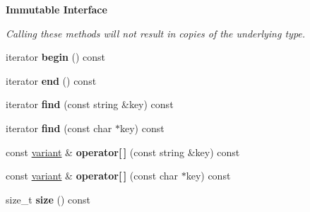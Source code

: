 \begin{Indent}\textbf{ Immutable Interface}\par
{\em Calling these methods will not result in copies of the underlying type. }\begin{DoxyCompactItemize}
\item 
\mbox{\label{classfc_1_1mutable__variant__object_a8c3f205309967abdb7fc54a6e87c2c76}} 
iterator {\bfseries begin} () const
\item 
\mbox{\label{classfc_1_1mutable__variant__object_a4d3913ee42df2e7d83a1a2f39f14b1fd}} 
iterator {\bfseries end} () const
\item 
\mbox{\label{classfc_1_1mutable__variant__object_adc3ed86b72879f95ffc2b9398a7995c8}} 
iterator {\bfseries find} (const string \&key) const
\item 
\mbox{\label{classfc_1_1mutable__variant__object_affd5b9ab3085b88e1f314da0affaabfb}} 
iterator {\bfseries find} (const char $\ast$key) const
\item 
\mbox{\label{classfc_1_1mutable__variant__object_a87ac08a28b843cc6342adb343edc85f6}} 
const \mbox{\hyperlink{classfc_1_1variant}{variant}} \& {\bfseries operator\mbox{[}$\,$\mbox{]}} (const string \&key) const
\item 
\mbox{\label{classfc_1_1mutable__variant__object_ae0d3415028e74c088642234907ece532}} 
const \mbox{\hyperlink{classfc_1_1variant}{variant}} \& {\bfseries operator\mbox{[}$\,$\mbox{]}} (const char $\ast$key) const
\item 
\mbox{\label{classfc_1_1mutable__variant__object_a0612732e6fcc4b2017dd7f15590d16bd}} 
size\+\_\+t {\bfseries size} () const
\end{DoxyCompactItemize}
\end{Indent}
